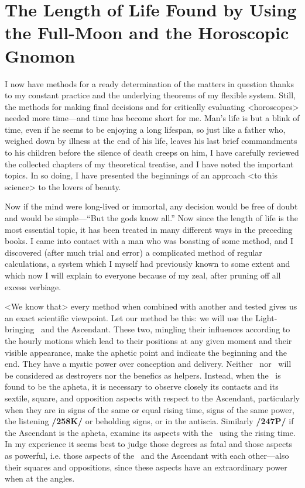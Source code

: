 \section{The Length of Life Found by Using the Full-Moon and the Horoscopic Gnomon}

I now have methods for a ready determination of the matters in question thanks to my constant practice and the underlying theorems of my flexible system. Still, the methods for making final decisions and for critically evaluating <horoscopes> needed more time—and time has become short for me. Man’s life is but a blink of time, even if he seems to be enjoying a long lifespan, so just like a father who, weighed down by illness at the end of his life, leaves his last brief commandments to his children before the silence of death creeps on him, I have carefully reviewed the collected chapters of my theoretical treatise, and I have noted the important topics. In so doing, I have presented the beginnings of an approach <to this science> to the lovers of beauty.

Now if the mind were long-lived or immortal, any decision would be free of doubt and would be simple—“But the gods know all.” Now since the length of life is the most essential topic, it has been treated in many different ways in the preceding books. I came into contact with a man who was boasting of some method, and I discovered (after much trial and error) a complicated method of regular calculations, a system which I myself had previously known to some extent and which now I will explain to everyone because of my zeal, after pruning off all excess verbiage. 

<We know that> every method when combined with another and tested gives us an exact scientific viewpoint. Let our method be this: we will use the Light-bringing \Moon\, and the Ascendant. These two,
mingling their influences according to the hourly motions which lead to their positions at any given moment and their visible appearance, make the aphetic point and indicate the beginning and the end. They have a mystic power over conception and delivery. Neither \Mars\, nor \Saturn\, will be considered as destroyers nor the benefics as helpers. Instead, when the \Moon\, is found to be the apheta, it is necessary to observe closely its contacts and its sextile, square, and opposition aspects with respect to the Ascendant, particularly when they are in signs of the same or equal rising time, signs of the same power, the listening \textbf{/258K/} or beholding signs, or in the antiscia. Similarly \textbf{/247P/} if the Ascendant is the apheta, examine its aspects with the \Moon\, using the rising time. In my experience it seems best to judge those degrees as fatal and those aspects as powerful, i.e. those aspects of the \Moon\, and the Ascendant with each other—also their squares and oppositions, since these aspects have an extraordinary power when at the angles.

